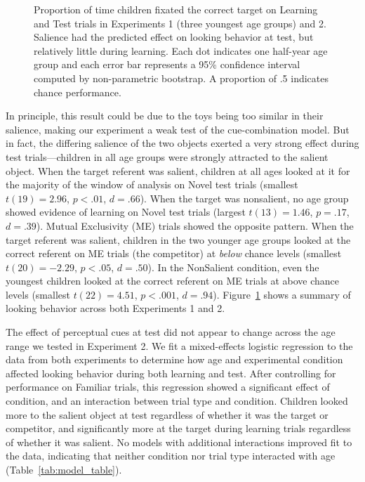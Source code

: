 \documentclass[man,floatsintext]{apa6}
\begin{document}
\begin{figure}[t]
	\caption{\label{fig:exp1_2} Proportion of time children fixated the correct target on Learning and Test trials in Experiments 1 (three youngest age groups) and 2. Salience had the predicted effect on looking behavior at test, but relatively little during learning. Each dot indicates one half-year age group and each error bar represents a 95\% confidence interval computed by non-parametric bootstrap. A proportion of .5 indicates chance performance.}
\end{figure}

In principle, this result could be due to the toys being too similar in their salience, making our experiment a weak test of the cue-combination model. But in fact, the differing salience of the two objects exerted a very strong effect during test trials---children in all age groups were strongly attracted to the salient object. When the target referent was salient, children at all ages looked at it for the majority of the window of analysis on Novel test trials (smallest $t(19)  = 2.96$, $p < .01$, $d = .66$). When the target was nonsalient, no age group showed evidence of learning on Novel test trials (largest $t(13)  = 1.46$, $p = .17$, $d = .39$). Mutual Exclusivity (ME) trials showed the opposite pattern. When the target referent was salient, children in the two younger age groups looked at the correct referent on ME trials (the competitor) at \emph{below} chance levels (smallest $t(20) = -2.29$, $p < .05$, $d = .50$). In the NonSalient condition, even the youngest children looked at the correct referent on ME trials at above chance levels (smallest $t(22) = 4.51$, $p < .001$, $d = .94$). Figure~\ref{fig:exp1_2} shows a summary of looking behavior across both Experiments 1 and 2.

The effect of perceptual cues at test did not appear to change across the age range we tested in Experiment 2. We fit a mixed-effects logistic regression to the data from both experiments to determine how age and experimental condition affected looking behavior during both learning and test. After controlling for performance on Familiar trials, this regression showed a significant effect of condition, and an interaction between trial type and condition. Children looked more to the salient object at test regardless of whether it was the target or competitor, and significantly more at the target during learning trials regardless of whether it was salient. No models with additional interactions improved fit to the data, indicating that neither condition nor trial type interacted with age (Table~\ref{tab:model_table}). 
\end{document}
